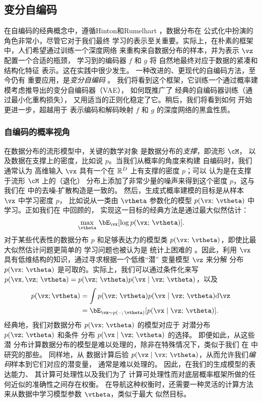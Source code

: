 \documentclass[../../book-main_zh.tex]{subfiles}
\begin{document}
\subsection{变分自编码}\label{sec:vae}

在自编码的经典概念中，遵循Hinton和Rumelhart
\cite{Rumelhart1986}，数据分布在
公式化中扮演的角色非常小，尽管它对于我们最终
学习的表示至关重要。实际上，在朴素的框架中，人们希望通过训练一个深度网络
来重构来自数据分布的样本，并为表示 $\vz$ 配置一个合适的瓶颈，
学习到的编码器 $f$ 和 $g$ 将
自然地最终对应于数据的紧凑和结构化特征
表示。这在实践中很少发生。
一种改进的、更现代的自编码方法，至今仍有
重要应用，是\textit{变分自编码}
\cite{Kingma2013-sb,Kingma2019-zh}。
我们将看到这个框架，它训练一个通过概率建模考虑推导出的变分自编码器（VAE），
如何既推广了
经典的自编码器训练（通过最小化重构损失），
又用适当的正则化稳定了它。稍后，我们将看到如何
开始更进一步，超越用于
表示编码和解码映射 $f$ 和 $g$ 的深度网络的黑盒性质。

\subsubsection{自编码的概率视角}
在数据分布的流形模型中，关键的数学对象
是数据分布的\textit{支撑}，即流形 $\cM$，
以及数据在支撑上的密度，比如说 $p$。当我们从概率的角度来构建
自编码时，我们通常认为
高维输入 $\vx$ 具有一个在 $\mathbb{R}^D$ 上有支撑的密度 $p$；可以
认为是在支撑于流形 $\cM$ 上的（退化）
分布上添加了非常少量的噪声来得到这个密度 $p$，这与我们在  中的去噪-扩散构造是一致的。
然后，生成式概率建模的目标是从样本 $\vx$ 中学习密度 $p$，
比如说从一类由 $\vtheta$ 参数化的模型 $p(\vx;\, \vtheta)$ 中学习。正如我们在  中回顾的，
实现这一目标的经典方法是通过最大似然估计：
\begin{equation*}\label{eq:VAE-MLE}
\max_{\vtheta}\, \bE_{\vx}[ \log p(\vx;\, \vtheta) ].
\end{equation*}
对于某些代表性的数据分布 $p$ %
和足够表达力的模型类 $p(\vx;\, \vtheta)$，即使比最大似然估计问题更简单的
学习问题也被认为是
统计上困难的 \cite{Yang1999-wb}。因此，利用
$\vx$ 具有低维结构的知识，通过寻求根据一个低维“潜”
变量模型 $\vz$ 来分解
分布 $p(\vx ;\, \vtheta)$ 是可取的。实际上，我们可以通过条件化来写 $p(\vx,
\vz ;\, \vtheta)
= p(\vz;\, \vtheta) p(\vx \mid \vz;\, \vtheta)$，以及
\begin{align*}
p(\vx; \vtheta) &= \int p(\vz;\, \vtheta) p(\vx \mid \vz;\, \vtheta) \odif \vz
\\
&=
\bE_{\vz \sim p(\,\cdot\,;\, \vtheta)}[ p(\vx \mid \vz;\, \vtheta) ].
\end{align*}
经典地，我们对数据分布 $p(\vx;\, \vtheta)$ 的模型对应于
对潜分布 $p(\vz;\, \vtheta)$ 和条件
分布 $p(\vx \mid \vz;\, \vtheta)$ 的选择。
即便如此，从这些潜
分布计算数据分布的模型是难以处理的，除非在特殊情况下，类似于我们
在  中研究的那些。
同样地，从
数据计算后验 $p(\vz \mid \vx;\, \vtheta)$，从而允许我们\textit{编码}样本到它们对应的潜变量，
通常是难以处理的。
因此，在我们的生成模型的表达能力、
其计算可处理性以及我们为了
计算可处理性而对底层概率框架所做的任何近似的准确性之间存在权衡。
在导航这种权衡时，还需要一种灵活的计算方法
来从数据中学习模型参数 $\vtheta$，类似于最大
似然目标。
\end{document}
